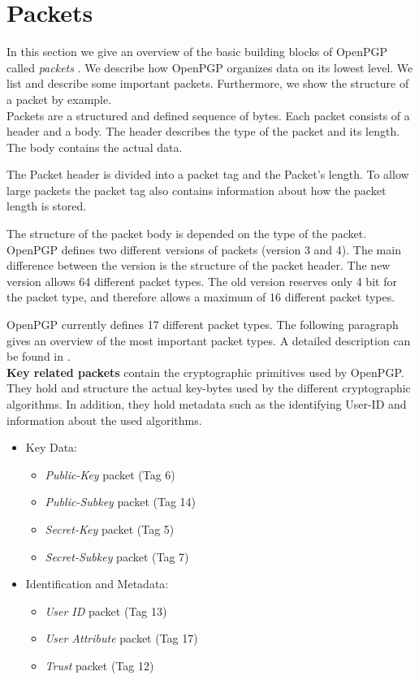 \section{Packets}
\label{section:messageformat:packets}

In this section we give an overview of the basic building blocks of OpenPGP called \textit{packets} \cite[section 5]{RFC4880}. We describe how OpenPGP organizes data on its lowest level. We list and describe some important packets. Furthermore, we show the structure of a packet by example.  \\


Packets are a structured and defined sequence of bytes.  Each packet consists of a header and a body. The header describes the type of the packet and its length. The body contains the actual data.

The Packet header is divided into a packet tag and the Packet's length. To allow large packets the packet tag also contains information about how the packet length is stored. 

The structure of the packet body is depended on the type of the packet. \\


OpenPGP defines two different versions of packets (version 3 and 4). The main difference between the version is the structure of the packet header. The new version allows 64 different packet types. The old version reserves only 4 bit for the packet type, and therefore allows a maximum of 16 different packet types.

OpenPGP currently defines 17 different packet types. The following paragraph gives an overview of the most important packet types. A detailed description can be found in \cite[section 5]{RFC4880}. \\ 


\textbf{Key related packets} contain the cryptographic primitives used by OpenPGP. They hold and structure the actual key-bytes used by the different cryptographic algorithms. In addition, they hold metadata such as the identifying User-ID and information about the used algorithms.

\begin{itemize}
	\item Key Data:
	\begin{itemize}
		\item \textit{Public-Key} packet (Tag 6)
		\item \textit{Public-Subkey} packet (Tag 14)
		\item \textit{Secret-Key} packet (Tag 5)
		\item \textit{Secret-Subkey} packet (Tag 7)
	\end{itemize}
	\item Identification and Metadata:
	\begin{itemize}
		\item \textit{User ID} packet (Tag 13)
		\item \textit{User Attribute} packet (Tag 17)
		\item \textit{Trust} packet (Tag 12)
	\end{itemize}
\end{itemize}

